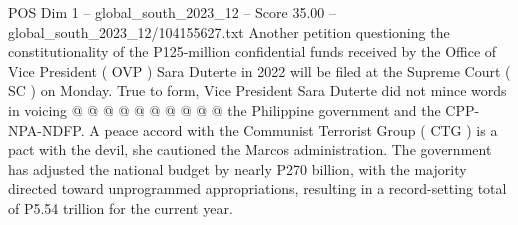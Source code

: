 \begin{textsample}{POS Dim 1 – global\_south\_2023\_12 – Score 35.00 – global\_south\_2023\_12/104155627.txt}
Another petition questioning the constitutionality of the P125-million confidential funds received by the Office of Vice President ( OVP ) Sara Duterte in 2022 will be filed at the Supreme Court ( SC ) on Monday.
True to form, Vice President Sara Duterte did not mince words in voicing @ @ @ @ @ @ @ @ @ @ the Philippine government and the CPP-NPA-NDFP.
A peace accord with the Communist Terrorist Group ( CTG ) is a pact with the devil, she cautioned the Marcos administration.
The government has adjusted the national budget by nearly P270 billion, with the majority directed toward unprogrammed appropriations, resulting in a record-setting total of P5.54 trillion for the current year.

\end{textsample}
